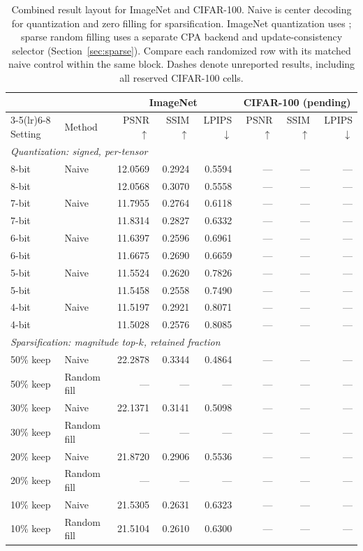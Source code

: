 \begin{table}[t]
\centering
\caption{Combined result layout for ImageNet and CIFAR-100.
Naive is center decoding for quantization and zero filling for sparsification.
ImageNet quantization uses \cora{}; sparse random filling uses a separate
CPA backend and update-consistency selector (Section~\ref{sec:sparse}).
Compare each randomized row with its matched naive control within the same
block. Dashes denote unreported results, including all reserved CIFAR-100 cells.}
\label{tab:compression}
\label{tab:bits}
\small
\setlength{\tabcolsep}{5pt}
\begin{tabular}{llrrr rrr}
\toprule
 & & \multicolumn{3}{c}{ImageNet} & \multicolumn{3}{c}{CIFAR-100 (pending)}\\
\cmidrule(lr){3-5}\cmidrule(lr){6-8}
Setting & Method & PSNR $\uparrow$ & SSIM $\uparrow$ & LPIPS $\downarrow$
 & PSNR $\uparrow$ & SSIM $\uparrow$ & LPIPS $\downarrow$\\
\midrule
\multicolumn{8}{l}{\textit{Quantization: signed, per-tensor}}\\
8-bit & Naive & 12.0569 & 0.2924 & 0.5594 & --- & --- & ---\\
8-bit & \cora{} & 12.0568 & 0.3070 & 0.5558 & --- & --- & ---\\
7-bit & Naive & 11.7955 & 0.2764 & 0.6118 & --- & --- & ---\\
7-bit & \cora{} & 11.8314 & 0.2827 & 0.6332 & --- & --- & ---\\
6-bit & Naive & 11.6397 & 0.2596 & 0.6961 & --- & --- & ---\\
6-bit & \cora{} & 11.6675 & 0.2690 & 0.6659 & --- & --- & ---\\
5-bit & Naive & 11.5524 & 0.2620 & 0.7826 & --- & --- & ---\\
5-bit & \cora{} & 11.5458 & 0.2558 & 0.7490 & --- & --- & ---\\
4-bit & Naive & 11.5197 & 0.2921 & 0.8071 & --- & --- & ---\\
4-bit & \cora{} & 11.5028 & 0.2576 & 0.8085 & --- & --- & ---\\
\midrule
\multicolumn{8}{l}{\textit{Sparsification: magnitude top-$k$, retained fraction}}\\
50\% keep & Naive & 22.2878 & 0.3344 & 0.4864 & --- & --- & ---\\
50\% keep & Random fill & --- & --- & --- & --- & --- & ---\\
30\% keep & Naive & 22.1371 & 0.3141 & 0.5098 & --- & --- & ---\\
30\% keep & Random fill & --- & --- & --- & --- & --- & ---\\
20\% keep & Naive & 21.8720 & 0.2906 & 0.5536 & --- & --- & ---\\
20\% keep & Random fill & --- & --- & --- & --- & --- & ---\\
10\% keep & Naive & 21.5305 & 0.2631 & 0.6323 & --- & --- & ---\\
10\% keep & Random fill & 21.5104 & 0.2610 & 0.6300 & --- & --- & ---\\
\bottomrule
\end{tabular}
\end{table}
